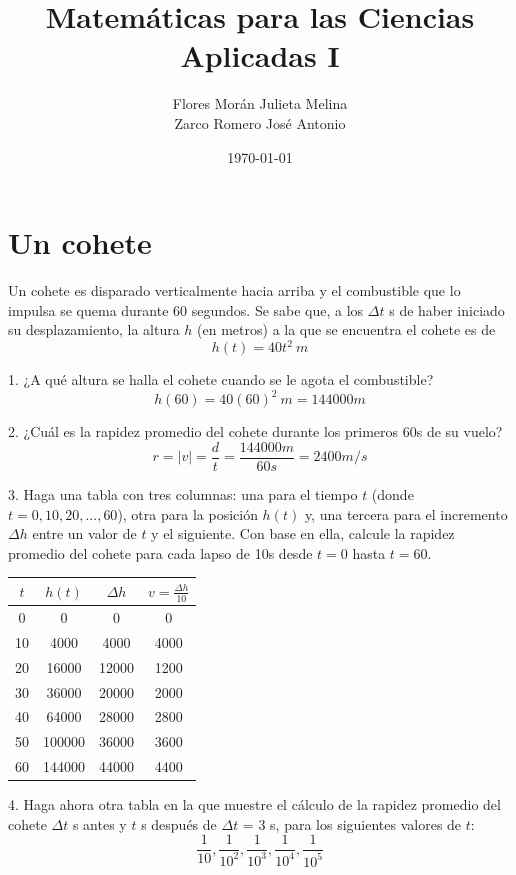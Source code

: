 \documentclass[12pt]{article}
\title{Matemáticas para las Ciencias Aplicadas I}
\date{\today}
\author{Flores Morán Julieta Melina \\ Zarco Romero José Antonio}
\begin{document}
\maketitle

\section{Un cohete}
Un cohete es disparado verticalmente hacia arriba y el combustible que lo impulsa se quema durante 60 segundos. Se sabe que, a los $\Delta t$ s de haber iniciado su desplazamiento, la altura $h$ (en metros) a la que se encuentra el cohete es de 
\[h (t) = 40 t^2 ~ m\]

1. ¿A qué altura se halla el cohete cuando se le agota el combustible?
\[h (60) = 40 (60)^2 ~ m = 144000m\]

2. ¿Cuál es la rapidez promedio del cohete durante los primeros 60s de su vuelo?
\[
r = |v| = \frac{d}{t} = \frac{ 144000m}{60s} =  2400 m/s
\]

3. Haga una tabla con tres columnas: una para el tiempo $t$ (donde $t = 0, 10, 20, . . . , 60$), otra para la posición $h(t)$ y, una tercera para el incremento $\Delta h$ entre un valor de $t$ y el siguiente. Con base en ella, calcule la rapidez promedio del cohete para cada lapso de 10s desde $t = 0$ hasta $t = 60$.\\

\begin{center}
\begin{tabular}{||c c c c||} 
 \hline
 $t$ & $h(t)$ &  $\Delta h$  & $v =\frac{\Delta h}{10}$ \\ [0.5ex] 
 \hline\hline
 0	& 0 & 0 & 0\\
10 & 	4000 &	4000 &	4000 \\
20	& 16000 &	12000	& 1200 \\
30 & 	36000	& 20000	& 2000 \\
40 & 	64000	& 28000 &	2800 \\
50	& 100000 & 	36000 &	3600 \\
60 & 	144000	& 44000	& 4400 \\ [1ex] 
\hline
\end{tabular}
\end{center}

4. Haga ahora otra tabla en la que muestre el cálculo de la rapidez promedio del cohete $\Delta t$ s antes y $t$ s después de $\Delta t $ = 3 s, para los siguientes valores de $t$:
\[
\frac{1}{10},\frac{1}{10 ^ 2} , \frac{1}{10 ^ 3}, \frac{1}{10 ^ 4}, \frac{1}{10 ^ 5}
\]
\end{document}
